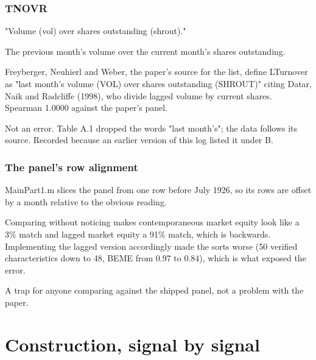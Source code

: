 \documentclass[11pt]{article}
\begin{document}
\subsubsection*{TNOVR}
\begin{description}[leftmargin=2.4cm,labelwidth=2.2cm,font=\normalfont\bfseries,style=sameline]
\item[Documented:] "Volume (vol) over shares outstanding (shrout)."
\item[Implemented:] The previous month's volume over the current month's shares outstanding.
\item[Evidence:] Freyberger, Neuhierl and Weber, the paper's source for the list, define LTurnover as "last month's volume (VOL) over shares outstanding (SHROUT)" citing Datar, Naik and Radcliffe (1998), who divide lagged volume by current shares. Spearman 1.0000 against the paper's panel.
\item[Why it matters:] Not an error. Table A.1 dropped the words "last month's"; the data follows its source. Recorded because an earlier version of this log listed it under B.
\end{description}
\subsubsection*{The panel's row alignment}
\begin{description}[leftmargin=2.4cm,labelwidth=2.2cm,font=\normalfont\bfseries,style=sameline]
\item[Implemented:] MainPart1.m slices the panel from one row before July 1926, so its rows are offset by a month relative to the obvious reading.
\item[Evidence:] Comparing without noticing makes contemporaneous market equity look like a 3\% match and lagged market equity a 91\% match, which is backwards. Implementing the lagged version accordingly made the sorts worse (50 verified characteristics down to 48, BEME from 0.97 to 0.84), which is what exposed the error.
\item[Why it matters:] A trap for anyone comparing against the shipped panel, not a problem with the paper.
\end{description}
\clearpage\section*{Construction, signal by signal}
\end{document}
